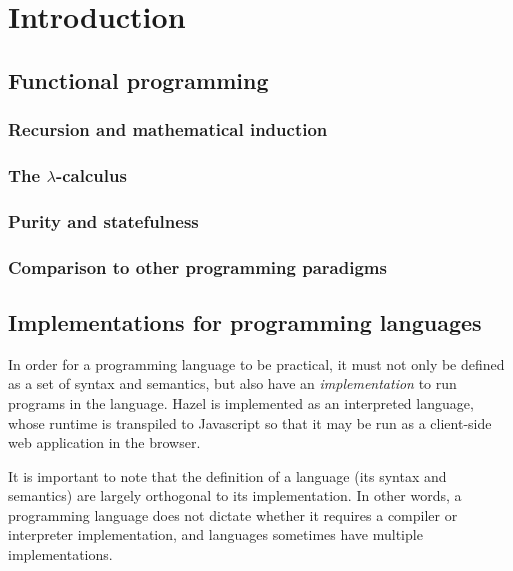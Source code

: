 \section{Introduction}
\label{sec:introduction}

\subsection{Functional programming}
\label{sec:fp}

\subsubsection{Recursion and mathematical induction}
\label{sec:recursion}

\subsubsection{The $\lambda$-calculus}
\label{sec:lambda_calculus}

\subsubsection{Purity and statefulness}
\label{sec:purity}

\subsubsection{Comparison to other programming paradigms}
\label{sec:fp_comp}

\subsection{Implementations for programming languages}
\label{sec:interpreters}

In order for a programming language to be practical, it must not only be defined as a set of syntax and semantics, but also have an \textit{implementation} to run programs in the language. Hazel is implemented as an interpreted language, whose runtime is transpiled to Javascript so that it may be run as a client-side web application in the browser.

It is important to note that the definition of a language (its syntax and semantics) are largely orthogonal to its implementation. In other words, a programming language does not dictate whether it requires a compiler or interpreter implementation, and languages sometimes have multiple implementations.

